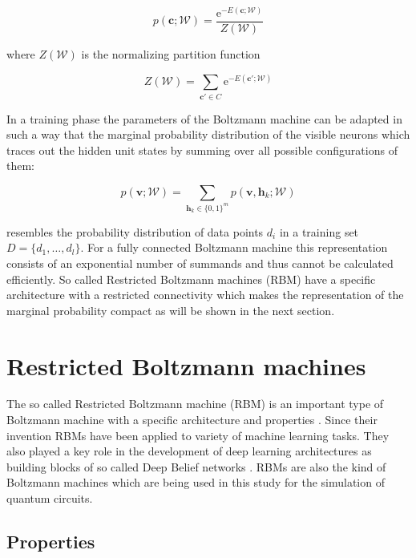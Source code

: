 \begin{equation}
   p(\bm{c};\mathcal{W}) = \frac{\mathrm{e}^{-E(\bm{c};\mathcal{W})}}{Z(\mathcal{W})}
\end{equation}

where $Z(\mathcal{W})$ is the normalizing partition function 

\begin{equation}
   Z(\mathcal{W}) = \sum_{\bm{c}\prime\in C} \mathrm{e}^{-E(\bm{c}\prime;\mathcal{W})}
\end{equation}

In a training phase the parameters of the Boltzmann machine can be adapted in such a way that 
the marginal probability distribution of the visible neurons which traces out the hidden unit 
states by summing over all possible configurations of them:

\begin{equation}
   p(\bm{v};\mathcal{W}) = \sum_{\bm{h}_k \in \{0,1\}^m} p(\bm{v},\bm{h}_k;\mathcal{W})
\end{equation}

resembles the probability distribution of data points $d_i$ in a training set $D=\{d_1,\dots,d_l\}$.
For a fully connected Boltzmann machine this representation consists of an exponential number of 
summands and thus cannot be calculated efficiently. So called Restricted Boltzmann machines
(RBM) have a specific architecture with a restricted connectivity which makes the representation 
of the marginal probability compact as will be shown in the next section.

\section{Restricted Boltzmann machines}
The so called Restricted Boltzmann machine (RBM) is an important type of Boltzmann machine with 
a specific architecture and properties \cite{smolensky1986information}. Since their invention RBMs have been applied to variety 
of machine learning tasks. They also played a 
key role in the development of deep learning architectures as building blocks of so called 
Deep Belief networks \cite{bengio2009learning, hinton2006fast}.
RBMs are also the kind of Boltzmann machines which are being used in this study for the simulation 
of quantum circuits.

\subsection{Properties}

